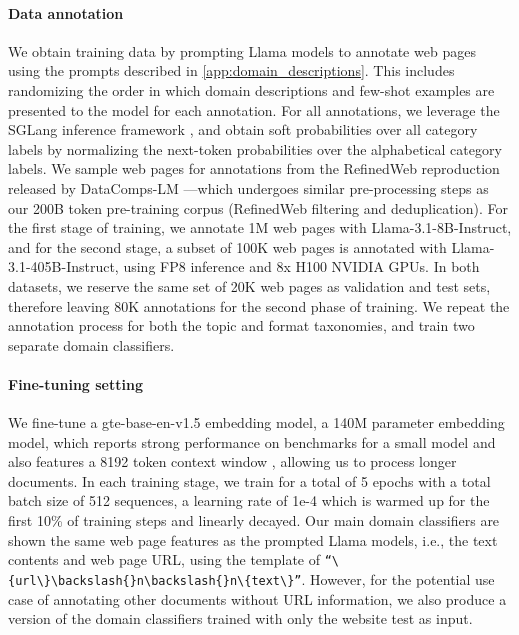 \paragraph{Data annotation}
We obtain training data by prompting Llama models to annotate web pages using the prompts described in \autoref{app:domain_descriptions}.
This includes randomizing the order in which domain descriptions and few-shot examples are presented to the model for each annotation.
For all annotations, we leverage the SGLang inference framework \citep{zheng2024sglang}, and obtain soft probabilities over all category labels by normalizing the next-token probabilities over the alphabetical category labels.
We sample web pages for annotations from the RefinedWeb reproduction released by DataComps-LM \citep{li2024datacomplm}---which undergoes similar pre-processing steps as our 200B token pre-training corpus (RefinedWeb filtering and deduplication).
For the first stage of training, we annotate 1M web pages with Llama-3.1-8B-Instruct, and for the second stage, a subset of 100K web pages is annotated with Llama-3.1-405B-Instruct, using FP8 inference and 8x H100 NVIDIA GPUs.
In both datasets, we reserve the same set of 20K web pages as validation and test sets, therefore leaving 80K annotations for the second phase of training.
We repeat the annotation process for both the topic and format taxonomies, and train two separate domain classifiers.


\paragraph{Fine-tuning setting}
We fine-tune a \mbox{gte-base-en-v1.5} embedding model, a 140M parameter embedding model, which reports strong performance on benchmarks for a small model and also features a 8192 token context window \citep{li2023gte}, allowing us to process longer documents.
In each training stage, we train for a total of 5 epochs with a total batch size of 512 sequences, a learning rate of 1e-4 which is warmed up for the first 10\% of training steps and linearly decayed.
Our main domain classifiers are shown the same web page features as the prompted Llama models, i.e., the text contents and web page URL, using the template of {\tt ``$\{$url$\}\backslash{}$n$\backslash{}$n$\{$text$\}$''}.
However, for the potential use case of annotating other documents without URL information, we also produce a version of the domain classifiers trained with only the website test as input.

